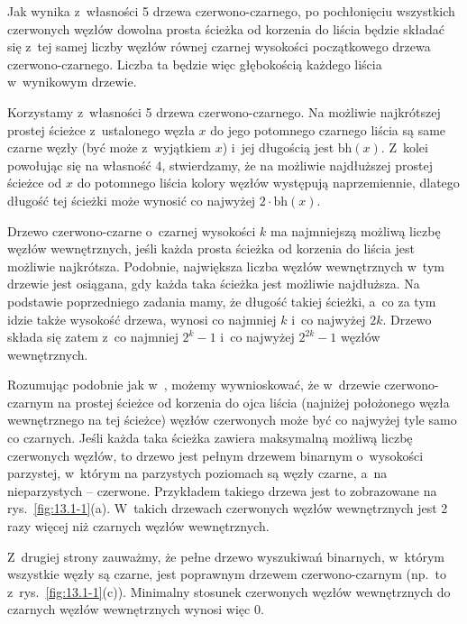 Jak wynika z~własności 5 drzewa czerwono-czarnego, po pochłonięciu wszystkich czerwonych węzłów dowolna prosta ścieżka od korzenia do liścia będzie składać się z~tej samej liczby węzłów równej czarnej wysokości początkowego drzewa czerwono-czarnego.
Liczba ta będzie więc głębokością każdego liścia w~wynikowym drzewie.

\exercise %
Korzystamy z~własności 5 drzewa czerwono-czarnego.
Na możliwie najkrótszej prostej ścieżce z~ustalonego węzła $x$ do jego potomnego czarnego liścia są same czarne węzły (być może z~wyjątkiem $x$) i~jej długością jest $\mathrm{bh}(x)$.
Z~kolei powołując się na własność 4, stwierdzamy, że na możliwie najdłuższej prostej ścieżce od $x$ do potomnego liścia kolory węzłów występują naprzemiennie, dlatego długość tej ścieżki może wynosić co najwyżej $2\cdot\mathrm{bh}(x)$.

\exercise %
Drzewo czerwono-czarne o~czarnej wysokości $k$ ma najmniejszą możliwą liczbę węzłów wewnętrznych, jeśli każda prosta ścieżka od korzenia do liścia jest możliwie najkrótsza.
Podobnie, największa liczba węzłów wewnętrznych w~tym drzewie jest osiągana, gdy każda taka ścieżka jest możliwie najdłuższa.
Na podstawie poprzedniego zadania mamy, że długość takiej ścieżki, a~co za tym idzie także wysokość drzewa, wynosi co najmniej $k$ i~co najwyżej $2k$.
Drzewo składa się zatem z~co najmniej $2^k-1$ i~co najwyżej $2^{2k}-1$ węzłów wewnętrznych.

\exercise %
Rozumując podobnie jak w~, możemy wywnioskować, że w~drzewie czerwono-czarnym na prostej ścieżce od korzenia do ojca liścia (najniżej położonego węzła wewnętrznego na tej ścieżce) węzłów czerwonych może być co najwyżej tyle samo co czarnych.
Jeśli każda taka ścieżka zawiera maksymalną możliwą liczbę czerwonych węzłów, to drzewo jest pełnym drzewem binarnym o~wysokości parzystej, w~którym na parzystych poziomach są węzły czarne, a~na nieparzystych -- czerwone.
Przykładem takiego drzewa jest to zobrazowane na rys.\ \ref{fig:13.1-1}(a).
W~takich drzewach czerwonych węzłów wewnętrznych jest 2 razy więcej niż czarnych węzłów wewnętrznych.

Z~drugiej strony zauważmy, że pełne drzewo wyszukiwań binarnych, w~którym wszystkie węzły są czarne, jest poprawnym drzewem czerwono-czarnym (np.\ to z~rys.\ \ref{fig:13.1-1}(c)).
Minimalny stosunek czerwonych węzłów wewnętrznych do czarnych węzłów wewnętrznych wynosi więc 0.
